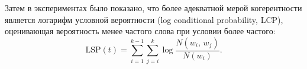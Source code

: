 \documentclass[article, 10pt]{disser}
\begin{document}
Затем в экспериментах было показано, что более адекватной мерой когерентности является логарифм условной вероятности (log conditional probability,
LCP), оценивающая вероятность менее частого слова при условии более частого:
\begin{equation*}
    \text{LSP}(t) = \sum\limits_{i=1}^{k-1}\sum\limits_{j =i}^{k}\log\frac{N(w_i,\,w_j)}{N(w_i)}.
\end{equation*}
\end{document}
